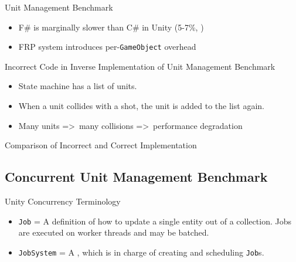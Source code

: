 

\begin{frame}{\secname}{\subsecname}
	Unit Management Benchmark
	\begin{itemize}
		\item F\# is marginally slower than C\# in Unity (5-7\%, \cite{maggiore2012formal,bolhuis2019gameplay})
		\item FRP system introduces per-\texttt{GameObject} overhead
	\end{itemize}
\end{frame}

\begin{frame}{\secname}{\subsecname}
	Incorrect Code in Inverse Implementation of Unit Management Benchmark
	\begin{itemize}
		\item State machine has a list of units.
		\item When a unit collides with a shot, the unit is added to the list again.
		\item Many units =\textgreater\ many collisions =\textgreater\ performance degradation
	\end{itemize}
\end{frame}

\begin{frame}[fragile]{\secname}{\subsecname}
	Comparison of Incorrect and Correct Implementation
\end{frame}

\subsection{Concurrent Unit Management Benchmark}

\begin{frame}{\secname}{\subsecname}
	Unity Concurrency Terminology
	\begin{itemize}
		\item \texttt{Job} = A definition of how to update a single entity out of a collection. Jobs are executed on worker threads and may be batched.
		\item \texttt{JobSystem} = A , which is in charge of creating and scheduling \texttt{Job}s.
	\end{itemize}
\end{frame}

